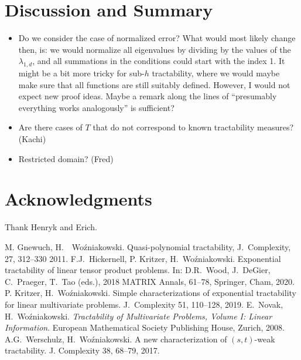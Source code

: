 \documentclass[11pt,a4paper]{article}
\newcommand{\fred}[1]{\begingroup\color{blue}#1\endgroup}
\newcommand{\peter}[1]{\begingroup\color{purple}#1\endgroup}
\begin{document}
\section{Discussion and Summary}

\fred{
\begin{itemize}
\item Do we consider the case of normalized error? \peter{What would most likely change then, is: we would normalize all eigenvalues by dividing by the values of the $\lambda_{1,d}$, and all summations in the conditions could start with the index 1. It might be a bit more tricky for sub-$h$ tractability, where we would maybe make sure that all functions are still suitably defined. However, I would not expect new proof ideas. Maybe a remark along the lines of ``presumably everything works analogously'' is sufficient?}
\item Are there cases of $T$ that do not correspond to known tractability measures? (Kachi)
\item Restricted domain? (Fred)
\end{itemize}}

\section{Acknowledgments}
Thank Henryk and Erich.

\begin{thebibliography}{99}
 M. Gnewuch, H.~~Wo\'zniakowski. Quasi-polynomial tractability, J.~Complexity, 27, 312--330 2011.
 F.J.~Hickernell, P. Kritzer, H.~Wo\'zniakowski.  Exponential tractability of linear tensor product problems. In:
D.R.~Wood, J.~DeGier, C.~Praeger, T.~Tao (eds.), 2018 MATRIX Annals, 61--78, Springer, Cham, 2020.
 P. Kritzer, H.~Wo\'zniakowski.
Simple characterizations of exponential tractability for linear
multivariate problems. J.~Complexity 51, 110--128, 2019.
 E.~Novak, H.~Wo\'zniakowski. \textit{Tractability of Multivariate Problems, Volume I: Linear Information}.
European Mathematical Society Publishing House, Zurich, 2008.
  A.G.~Werschulz, H.~Wo\'zniakowski. A new characterization of $(s,t)$-weak tractability. J. Complexity 38, 68--79, 2017.


\end{thebibliography}
\end{document}
